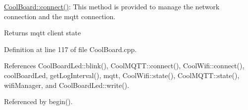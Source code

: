 \hyperlink{classCoolBoard_a519de78b807f8ec6463ff484eb925918}{Cool\+Board\+::connect()}\+: This method is provided to manage the network connection and the mqtt connection.

\begin{DoxyReturn}{Returns}
mqtt client state 
\end{DoxyReturn}


Definition at line 117 of file Cool\+Board.\+cpp.



References Cool\+Board\+Led\+::blink(), Cool\+M\+Q\+T\+T\+::connect(), Cool\+Wifi\+::connect(), cool\+Board\+Led, get\+Log\+Interval(), mqtt, Cool\+Wifi\+::state(), Cool\+M\+Q\+T\+T\+::state(), wifi\+Manager, and Cool\+Board\+Led\+::write().



Referenced by begin().


